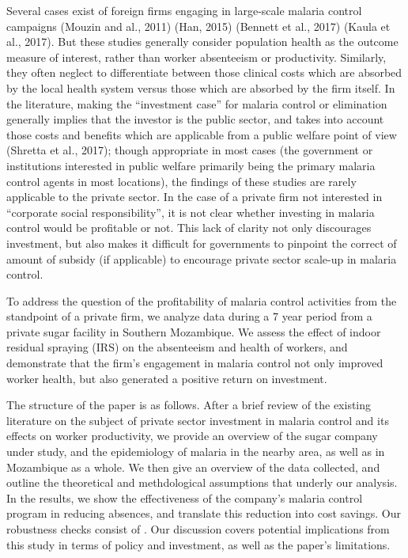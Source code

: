 \documentclass[]{article}
\begin{document}
Several cases exist of foreign firms engaging in large-scale malaria
control campaigns (Mouzin and al., 2011) (Han, 2015) (Bennett et al.,
2017) (Kaula et al., 2017). But these studies generally consider
population health as the outcome measure of interest, rather than worker
absenteeism or productivity. Similarly, they often neglect to
differentiate between those clinical costs which are absorbed by the
local health system versus those which are absorbed by the firm itself.
In the literature, making the ``investment case'' for malaria control or
elimination generally implies that the investor is the public sector,
and takes into account those costs and benefits which are applicable
from a public welfare point of view (Shretta et al., 2017); though
appropriate in most cases (the government or institutions interested in
public welfare primarily being the primary malaria control agents in
most locations), the findings of these studies are rarely applicable to
the private sector. In the case of a private firm not interested in
``corporate social responsibility'', it is not clear whether investing
in malaria control would be profitable or not. This lack of clarity not
only discourages investment, but also makes it difficult for governments
to pinpoint the correct of amount of subsidy (if applicable) to
encourage private sector scale-up in malaria control.

To address the question of the profitability of malaria control
activities from the standpoint of a private firm, we analyze data during
a 7 year period from a private sugar facility in Southern Mozambique. We
assess the effect of indoor residual spraying (IRS) on the absenteeism
and health of workers, and demonstrate that the firm's engagement in
malaria control not only improved worker health, but also generated a
positive return on investment.

The structure of the paper is as follows. After a brief review of the
existing literature on the subject of private sector investment in
malaria control and its effects on worker productivity, we provide an
overview of the sugar company under study, and the epidemiology of
malaria in the nearby area, as well as in Mozambique as a whole. We then
give an overview of the data collected, and outline the theoretical and
methdological assumptions that underly our analysis. In the results, we
show the effectiveness of the company's malaria control program in
reducing absences, and translate this reduction into cost savings. Our
robustness checks consist of . Our discussion
covers potential implications from this study in terms of policy and
investment, as well as the paper's limitations.
\end{document}
